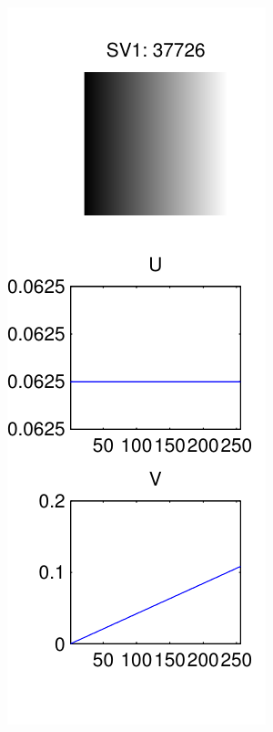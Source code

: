 \documentclass{report}
\begin{document}
\begin{figure}[H]
        \centering
        \begin{subfigure}[b]{0.2\textwidth}
                \includegraphics[width=\textwidth]{graphics/singular_vectors_gradient.pdf}

\end{subfigure}
\end{figure}
\end{document}
